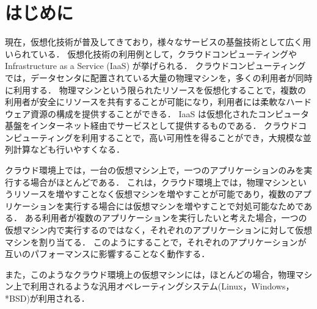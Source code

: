 \documentclass[graduation-thesis]{mlarticle}
\author{61200185 情報工学科 縣直道}
\date{\today}
\title{}
\begin{document}
\makeatletter
\renewcommand{\thetable}{
        \thesection.\arabic{table}
} %
  
\renewcommand{\thefigure}{
        \thesection.\arabic{figure}
}

\setcounter{page}{1}

\tableofcontents
\clearpage


 

\section{はじめに}
\label{intro}
現在，仮想化技術が普及してきており，様々なサービスの基盤技術として広く用いられている．
仮想化技術の利用例として，クラウドコンピューティングやInfrastructure as a Service (IaaS) が挙げられる．
クラウドコンピューティングでは，データセンタに配置されている大量の物理マシンを，多くの利用者が同時に利用する．
物理マシンという限られたリソースを仮想化することで，複数の利用者が安全にリソースを共有することが可能になり，利用者には柔軟なハードウェア資源の構成を提供することができる．
IaaS は仮想化されたコンピュータ基盤をインターネット経由でサービスとして提供するものである．
クラウドコンピューティングを利用することで，高い可用性を得ることができ，大規模な並列計算なども行いやすくなる．

クラウド環境上では，一台の仮想マシン上で，一つのアプリケーションのみを実行する場合がほとんどである．
これは，クラウド環境上では，物理マシンというリソースを増やすことなく仮想マシンを増やすことが可能であり，複数のアプリケーションを実行する場合には仮想マシンを増やすことで対処可能なためである．
ある利用者が複数のアプリケーションを実行したいと考えた場合，一つの仮想マシン内で実行するのではなく，それぞれのアプリケーションに対して仮想マシンを割り当てる．
このようにすることで，それぞれのアプリケーションが互いのパフォーマンスに影響することなく動作する．

また，このようなクラウド環境上の仮想マシンには，ほとんどの場合，物理マシン上で利用されるような汎用オペレーティングシステム(Linux，Windows，*BSD)が利用される．
\end{document}
